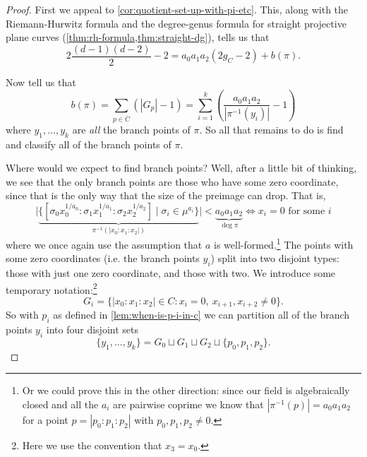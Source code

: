 \documentclass[10pt,notitlepage]{article}
\numberwithin{equation}{subsection}
\newcommand{\cover}[1]{\overline{#1}}
\begin{document}
            \begin{proof}
                First we appeal to \cref{cor:quotient-set-up-with-pi-etc}.
                This, along with the Riemann-Hurwitz formula and the degree-genus formula for straight projective plane curves (\cref{thm:rh-formula,thm:straight-dg}), tells us that
                \begin{equation}\label{eqn:thing-in-proof-to-rearrange}
                    2\frac{(d-1)(d-2)}{2}-2 = a_0a_1a_2(2g_C-2) + b(\pi).                
                \end{equation}

                Now \cite[Chapter~III,~Corollary~3.6]{Miranda:1995uz} tell us that
                \[
                    b(\pi) = \sum_{p\in\cover{C}}(|G_p|-1) = \sum_{i=1}^k\left(\frac{a_0a_1a_2}{|\pi^{-1}(y_i)|}-1\right)
                \]
                where $y_1,\ldots,y_k$ are \emph{all} the branch points of $\pi$.
                So all that remains to do is find and classify all of the branch points of $\pi$.

                Where would we expect to find branch points?
                Well, after a little bit of thinking, we see that the only branch points are those who have some zero coordinate, since that is the only way that the size of the preimage can drop.
                That is,
                \[
                    \bigg|\underbrace{\big\{[\sigma_0 x_0^{1/a_0}:\sigma_1 x_1^{1/a_1}:\sigma_2 x_2^{1/a_2}] \mid \sigma_i\in\mu^{a_i}\big\}}_{\pi^{-1}(|x_0:x_1:x_2|)}\bigg| < \underbrace{a_0a_1a_2}_{\deg\pi} \iff x_i=0\text{ for some }i
                \]
                where we once again use the assumption that $a$ is well-formed.\footnote{%
                    Or we could prove this in the other direction: since our field is algebraically closed and all the $a_i$ are pairwise coprime we know that $|\pi^{-1}(p)|=a_0a_1a_2$ for a point $p=|p_0:p_1:p_2|$ with $p_0,p_1,p_2\neq0$.
                }
                The points with some zero coordinates (i.e. the branch points $y_i$) split into two disjoint types: those with just one zero coordinate, and those with two.
                We introduce some temporary notation:\footnote{%
                    Here we use the convention that $x_3=x_0$.
                }
                \[
                    G_i = \{|x_0:x_1:x_2|\in C : x_i=0,~x_{i+1},x_{i+2}\neq0\}.
                \]
                So with $p_i$ as defined in \cref{lem:when-is-p-i-in-c} we can partition all of the branch points $y_i$ into four disjoint sets
                \[
                    \{y_1,\ldots,y_k\} = G_0\sqcup G_1\sqcup G_2\sqcup\{p_0,p_1,p_2\}.
                \]


\end{proof}
\end{document}
